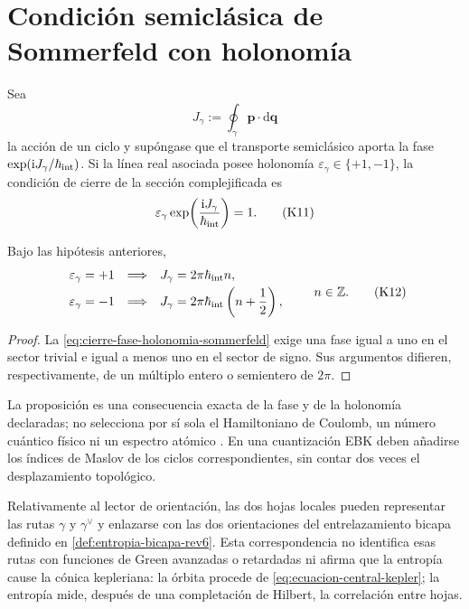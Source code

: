\section{Condición semiclásica de Sommerfeld con holonomía}
\label{sec:sommerfeld-holonomia-banda}

Sea
\[
 J_\gamma:=\oint_\gamma\mathbf p\cdot\mathrm d\mathbf q
\]
la acción de un ciclo y supóngase que el transporte semiclásico aporta la
fase \(\exp(\mathrm iJ_\gamma/\hbar_{\rm int})\). Si la línea real asociada
posee holonomía \(\varepsilon_\gamma\in\{+1,-1\}\), la condición de cierre de
la sección complejificada es
\[
 \varepsilon_\gamma
 \exp\!\left(\frac{\mathrm iJ_\gamma}{\hbar_{\rm int}}\right)=1.
 \tag{K11}\label{eq:cierre-fase-holonomia-sommerfeld}
\]

\begin{proposition}
\label{prop:desplazamiento-sommerfeld-holonomia}
Bajo las hipótesis anteriores,
\[
 \begin{array}{lll}
 \varepsilon_\gamma=+1
 &\Longrightarrow&
 J_\gamma=2\pi\hbar_{\rm int}n,\\[1mm]
 \varepsilon_\gamma=-1
 &\Longrightarrow&
 J_\gamma=2\pi\hbar_{\rm int}\left(n+\dfrac12\right),
 \end{array}
 \qquad n\in\mathbb Z.
 \tag{K12}\label{eq:cuantizacion-sommerfeld-holonomia}
\]
\end{proposition}

\begin{proof}
La \cref{eq:cierre-fase-holonomia-sommerfeld} exige una fase igual a uno en
el sector trivial e igual a menos uno en el sector de signo. Sus argumentos
difieren, respectivamente, de un múltiplo entero o semientero de \(2\pi\).
\end{proof}

La proposición es una consecuencia exacta de la fase y de la holonomía
declaradas; no selecciona por sí sola el Hamiltoniano de Coulomb, un número
cuántico físico ni un espectro atómico \cite{Sommerfeld1916}. En una
cuantización EBK deben añadirse los índices de Maslov de los ciclos
correspondientes, sin contar dos veces el desplazamiento topológico.

Relativamente al lector de orientación, las dos hojas locales pueden
representar las rutas \(\gamma\) y \(\gamma^\vee\) y enlazarse con las
dos orientaciones del entrelazamiento bicapa definido en
\cref{def:entropia-bicapa-rev6}. Esta correspondencia no identifica
esas rutas con funciones de Green avanzadas o retardadas ni afirma que la
entropía cause la cónica kepleriana: la órbita procede de
\eqref{eq:ecuacion-central-kepler}; la entropía mide, después de una
completación de Hilbert, la correlación entre hojas.

